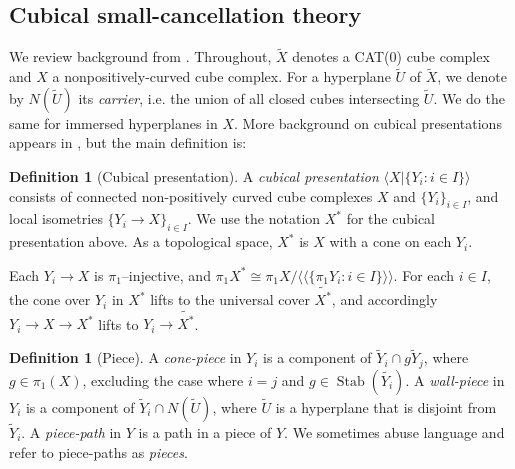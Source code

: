 \documentclass[11pt,oneside]{amsart}
\theoremstyle{definition}
\newtheorem{defn}[thm]{Definition}
\DeclareMathOperator{\stabilizer}{Stab}
\newcommand{\nclose}[1]{\langle\langle#1\rangle\rangle}
\begin{document}



\subsection{Cubical small-cancellation theory}\label{subsec:small-cancellation}
We review background from \cite{Wise:QCH}.  Throughout,  $\widetilde X$ denotes a CAT(0) cube complex and $X$ a nonpositively-curved cube complex.  For a hyperplane $\widetilde{U}$ of $\widetilde{X}$, we denote by $N(\widetilde{U})$ its \emph{carrier}, i.e. the union of all closed cubes intersecting $\widetilde{U}$.  We do the same for immersed hyperplanes in $X$. More background on cubical presentations appears in \cite[Sec. 3.b]{Wise:QCH}, but the main definition is:

\begin{defn}[Cubical presentation]\label{defn:cubical_presentation}
A \emph{cubical presentation} $\langle X | \{Y_i:i\in I\}\rangle$ consists of connected non-positively curved cube complexes $X$ and $\{Y_i\}_{i\in I}$, and local isometries $\{Y_i \to X\}_{i\in I}$. We use the notation $X^*$ for the cubical presentation above. As a topological space, $X^*$ is $X$ with a cone on each $Y_i$.
\end{defn}

  Each $Y_i\to X$ is $\pi_1$--injective, and $\pi_1X^*\cong\pi_1X/\nclose{\{\pi_1Y_i:i\in I\}}$.  For each $i\in I$, the cone over $Y_i$ in $X^*$ lifts to the universal cover $\widetilde{X^*}$, and accordingly $Y_i\to X\to X^*$ lifts to $Y_i\to\widetilde{X^*}$.

\begin{defn}[Piece]\label{defn:piece}
A \emph{cone-piece} in $Y_i$ is a component of $\widetilde{Y}_i \cap g \widetilde{Y}_j$, where $g \in \pi_1(X)$, excluding the case where $i = j$ and $g \in \stabilizer( \widetilde{Y_i} )$. A \emph{wall-piece} in $Y_i$ is a component of $\widetilde{Y}_i \cap N(\widetilde{U})$, where $\widetilde{U}$ is a hyperplane that is disjoint from  $\widetilde{Y}_i$.  A \emph{piece-path} in $Y$ is a path in a piece of $Y$.  We sometimes abuse language and refer to piece-paths as \emph{pieces}.
\end{defn}
\end{document}
